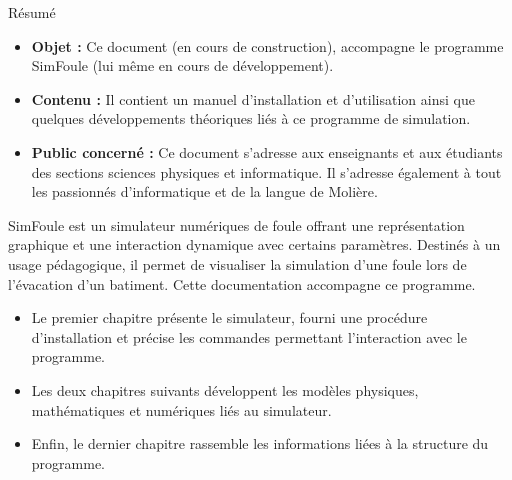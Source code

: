 \begin{center}
\Large
Résumé
\normalsize
\end{center}
\vspace{3cm}
\begin{itemize}[leftmargin=1cm, label=, itemsep=21pt]
\item {\bf Objet : }Ce document (en cours de construction), accompagne le programme SimFoule (lui même en cours de développement).
\item {\bf Contenu : }Il contient un manuel d'installation et d'utilisation ainsi que quelques développements théoriques liés à ce programme de simulation.
\item {\bf Public concerné : }Ce document s'adresse aux enseignants et aux étudiants des sections sciences physiques et informatique. Il s'adresse également à tout les passionnés d'informatique et de la langue de Molière.
\end{itemize}

\vspace{3cm}

SimFoule est un simulateur numériques de foule offrant une représentation graphique et une interaction dynamique avec certains paramètres. Destinés à un usage pédagogique, il permet de visualiser la simulation d'une foule lors de l'évacation d'un batiment. Cette documentation accompagne ce programme.

\begin{itemize}[leftmargin=1cm, label=, itemsep=11pt]
\item Le premier chapitre présente le simulateur, fourni une procédure d'installation et précise les commandes permettant l'interaction avec le programme.
\item Les deux chapitres suivants développent les modèles physiques, mathématiques et numériques liés au simulateur.
\item Enfin, le dernier chapitre rassemble les informations liées à la structure du programme.
\end{itemize}
